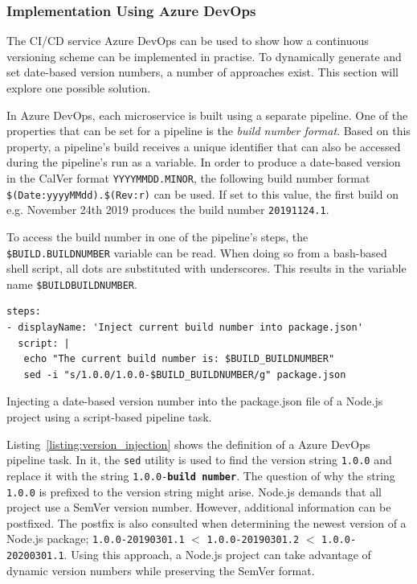 \subsubsection{Implementation Using Azure DevOps}%
\label{ssub:Implementation_Using_Azure_DevOps}
The \ac{CI}/\ac{CD} service Azure DevOps can be used to show how a continuous
versioning scheme can be implemented in practise. To dynamically generate and
set date-based version numbers, a number of approaches exist. This section will
explore one possible solution.

In Azure DevOps, each microservice is built using a separate pipeline. One of
the properties that can be set for a pipeline is the \textit{build number
format}. Based on this property, a pipeline's build receives a unique identifier
that can also be accessed during the pipeline's run as a variable. In order to
produce a date-based version in the CalVer format \texttt{YYYYMMDD.MINOR}, the
following build number format \texttt{\$(Date:yyyyMMdd).\$(Rev:r)} can be used.
If set to this value, the first build on e.g. November 24th 2019 produces the
build number \texttt{20191124.1}.

To access the build number in one of the pipeline's steps, the
\texttt{\$BUILD.BUILDNUMBER} variable can be read. When doing so from a
bash-based shell script, all dots are substituted with underscores. This
results in the variable name \texttt{\$BUILD\textunderscore BUILDNUMBER}.

\begin{listing}[H]
  \begin{verbatim}
steps:
- displayName: 'Inject current build number into package.json'
  script: |
   echo "The current build number is: $BUILD_BUILDNUMBER"
   sed -i "s/1.0.0/1.0.0-$BUILD_BUILDNUMBER/g" package.json
  \end{verbatim}
  \caption{Injecting a date-based version number into the package.json file of
  a Node.js project using a script-based pipeline task.}%
  \label{listing:version_injection}
\end{listing}

Listing~\ref{listing:version_injection} shows the definition of a Azure DevOps
pipeline task. In it, the \texttt{sed} utility is used to find the version
string \texttt{1.0.0} and replace it with the string
\texttt{1.0.0-\textbf{build number}}. The question of why the string
\texttt{1.0.0} is prefixed to the version string might arise. Node.js demands
that all project use a SemVer version number. However, additional information
can be postfixed. The postfix is also consulted when determining the newest
version of a Node.js package; \texttt{1.0.0-20190301.1} $<$
\texttt{1.0.0-20190301.2} $<$ \texttt{1.0.0-20200301.1}. Using this approach, a
Node.js project can take advantage of dynamic version numbers while preserving
the SemVer format.

